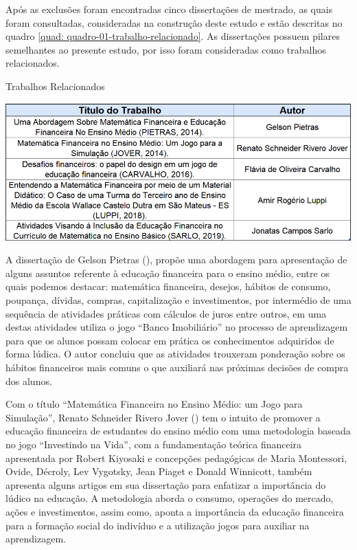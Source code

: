 Após as exclusões foram encontradas cinco dissertações de mestrado, as quais foram consultadas, consideradas na construção deste estudo e estão descritas no quadro \ref{quad: quadro-01-trabalho-relacionado}. As dissertações possuem pilares semelhantes ao presente estudo, por isso foram consideradas como trabalhos relacionados.

\graphicspath{{quadros/}}
\begin{quadro}[!ht]
\centering
\begin{minipage}{1\textwidth}
\caption{Trabalhos Relacionados}
\centering
\includegraphics[width=1\textwidth]{quadro-01-trabalho-relacionado.png}
\label{quad: quadro-01-trabalho-relacionado}
\end{minipage}
\end{quadro}

\newpage
A dissertação de Gelson Pietras (\citeyear{pietras2014}), propõe uma abordagem para apresentação de alguns assuntos referente à educação financeira para o ensino médio, entre os quais podemos destacar: matemática financeira, desejos, hábitos de consumo, poupança, dívidas, compras, capitalização e investimentos, por intermédio de uma sequência de atividades práticas com cálculos de juros entre outros, em uma destas atividades utiliza o jogo “Banco Imobiliário” no processo de aprendizagem para que os alunos possam colocar em prática os conhecimentos adquiridos de forma lúdica. O autor concluiu que as atividades trouxeram ponderação sobre os hábitos financeiros mais comuns o que auxiliará nas próximas decisões de compra dos alunos.

Com o título “Matemática Financeira no Ensino Médio: um Jogo para Simulação”, Renato Schneider Rivero Jover (\citeyear{jover2014}) tem o intuito de promover a educação financeira de estudantes do ensino médio com uma metodologia baseada no jogo “Investindo na Vida”, com a fundamentação teórica financeira apresentada por Robert Kiyosaki e concepções pedagógicas de Maria Montessori, Ovide, Décroly, Lev Vygotsky, Jean Piaget e Donald Winnicott, também apresenta alguns artigos em sua dissertação para enfatizar a importância do lúdico na educação. A metodologia aborda o consumo, operações do mercado, ações e investimentos, assim como, aponta a importância da educação financeira para a formação social do indivíduo e a utilização jogos para auxiliar na aprendizagem.

